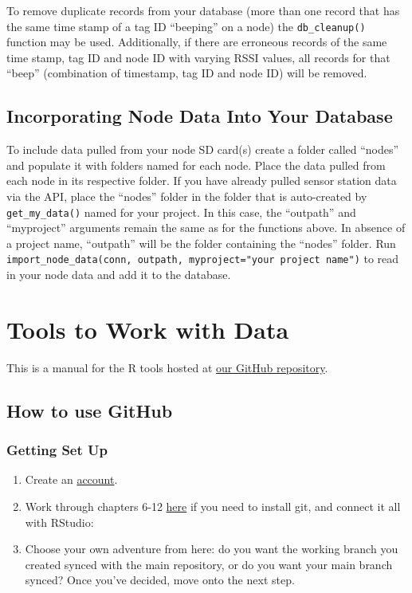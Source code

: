 \documentclass[
]{book}
\providecommand{\tightlist}{%
  \setlength{\itemsep}{0pt}\setlength{\parskip}{0pt}}
\begin{document}
To remove duplicate records from your database (more than one record that has the same time stamp of a tag ID ``beeping'' on a node) the \texttt{db\_cleanup()} function may be used. Additionally, if there are erroneous records of the same time stamp, tag ID and node ID with varying RSSI values, all records for that ``beep'' (combination of timestamp, tag ID and node ID) will be removed.

\section{Incorporating Node Data Into Your Database}\label{incorporating-node-data-into-your-database}

To include data pulled from your node SD card(s) create a folder called ``nodes'' and populate it with folders named for each node. Place the data pulled from each node in its respective folder. If you have already pulled sensor station data via the API, place the ``nodes'' folder in the folder that is auto-created by \texttt{get\_my\_data()} named for your project. In this case, the ``outpath'' and ``myproject'' arguments remain the same as for the functions above. In absence of a project name, ``outpath'' will be the folder containing the ``nodes'' folder. Run \texttt{import\_node\_data(conn,\ outpath,\ myproject="your\ project\ name")} to read in your node data and add it to the database.

\chapter{Tools to Work with Data}\label{tools-to-work-with-data}

This is a manual for the R tools hosted at \href{https://github.com/cellular-tracking-technologies/data_tools}{our GitHub repository}.

\section*{How to use GitHub}\label{how-to-use-github}

\subsection*{Getting Set Up}\label{getting-set-up}

\begin{enumerate}
\def\labelenumi{\arabic{enumi}.}
\tightlist
\item
  Create an \href{https://github.com}{account}.
\item
  Work through chapters 6-12 \href{https://happygitwithr.com/install-git.html}{here} if you need to install git, and connect it all with RStudio:
\item
  Choose your own adventure from here: do you want the working branch you created synced with the main repository, or do you want your main branch synced? Once you've decided, move onto the next step.
\end{enumerate}
\end{document}
